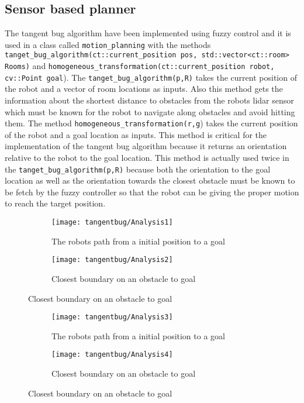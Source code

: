\documentclass[../Head/Main.tex]{subfiles}
\begin{document}
\subsection{Sensor based planner}
\label{subsec:tangentBug}

The tangent bug algorithm have been implemented using fuzzy control and it is used in a class called \texttt{motion\_planning} with the methods \texttt{tanget\_bug\_algorithm(ct::current\_position pos, std::vector<ct::room> Rooms)} and \texttt{homogeneous\_transformation(ct::current\_position robot, cv::Point goal}). The \texttt{tanget\_bug\_algorithm(p,R)} takes the current position of the robot and a vector of room locations as inputs. Also this method gets the information about the shortest distance to obstacles from the robots lidar sensor which must be known for the robot to navigate along obstacles and avoid hitting them. The method \texttt{homogeneous\_transformation(r,g}) takes the current position of the robot and a goal location as inputs. This method is critical for the implementation of the tangent bug algorithm because it returns an orientation relative to the robot to the goal location. This method is actually used twice in the \texttt{tanget\_bug\_algorithm(p,R)} because both the orientation to the goal location as well as the orientation towards the closest obstacle must be known to be fetch by the fuzzy controller so that the robot can be giving the proper motion to reach the target position. 


\begin{figure}[H]
  \begin{subfigure}[b]{0.59\textwidth}
    \centering
    \texttt{[image: tangentbug/Analysis1]}
    \caption{The robots path from a initial position to a goal}
    \label{fig:tangentBugRobotPath1}
  \end{subfigure}
  \hfill
   \begin{subfigure}[b]{0.39\textwidth}
    \centering
    \texttt{[image: tangentbug/Analysis2]}
    \caption{Closest boundary on an obstacle to goal}
    \label{fig:closestBoundaryOnObstacle1}
  \end{subfigure}
  \end{figure}
  
\begin{figure}[H]
  \begin{subfigure}[b]{0.59\textwidth}
    \centering
    \texttt{[image: tangentbug/Analysis3]}
    \caption{The robots path from a initial position to a goal}
    \label{fig:tangentBugRobotPath2}
  \end{subfigure}
  \hfill
   \begin{subfigure}[b]{0.39\textwidth}
    \centering
    \texttt{[image: tangentbug/Analysis4]}
    \caption{Closest boundary on an obstacle to goal}
    \label{fig:closestBoundaryOnObstacle2}
  \end{subfigure}
  \end{figure}
  
\end{document}
